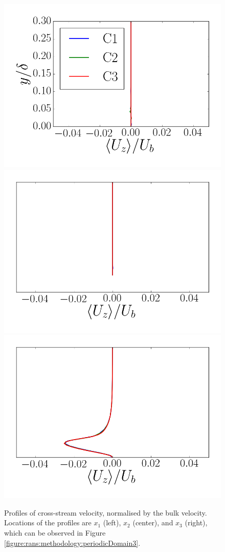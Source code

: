 \documentclass[12pt,oneside,a4paper]{article}
\begin{document}
\begin{figure}[b]
\centering
\includegraphics[width=0.33\linewidth]{images/CFD_meshIndependence/X1_Ux.png}\hfill \includegraphics[width=0.33\linewidth]{images/CFD_meshIndependence/X2_Ux.png}\hfill \includegraphics[width=0.33\linewidth]{images/CFD_meshIndependence/X3_Ux.png}\hfill
\caption{Profiles of cross-stream velocity, normalised by the bulk velocity. Locations of the profiles are $x_1$ (left), $x_2$ (center), and $x_3$ (right), which can be observed in Figure \ref{figure:rans:methodology:periodicDomain3}.}
\label{figure:rans:Uz}
\end{figure}
\end{document}
